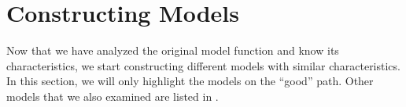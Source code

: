 \section{Constructing Models}
\label{sec:setup.models}

Now that we have analyzed the original model function and know its characteristics, we start constructing different models with similar characteristics.
In this section, we will only highlight the models on the ``good'' path.
Other models that we also examined are listed in .





